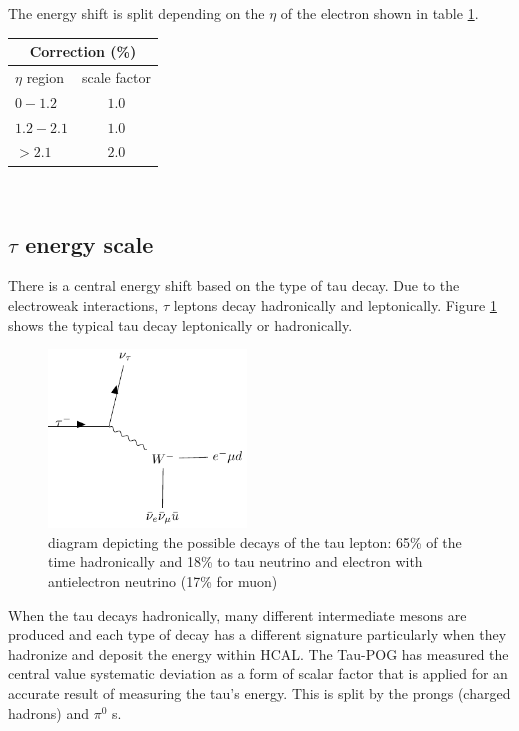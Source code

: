 The energy shift is split depending on the $\eta$ of the electron shown in table \ref{tab:EES}.\\
\begin{table}[h]
  \begin{center}
    \label{tab:EES}
    \begin{tabular} { l | c }
      \hline \multicolumn{2}{c}{Correction (\%)} \\
      \hline $\eta$ region & scale factor  \\ \hline
      $0 - 1.2$ & $1.0$ \\ 
      $1.2 - 2.1 $& $1.0 $\\ 
      $> 2.1$ & $2.0$ \\ 
    \end{tabular}
  \end{center}
\end{table}\\

\subsection{$\tau$ energy scale}
There is a central energy shift based on the type of tau decay. Due to the electroweak interactions, $\tau$ leptons decay hadronically and leptonically. Figure \ref{fig:taudecay} shows the typical tau decay leptonically or hadronically.  \\

\begin{figure}[ht!b]
\begin{center}
  \includegraphics[width=0.47\textwidth]{"Figures/taudecay.pdf"}
    \caption{\label{fig:taudecay} diagram depicting the possible decays of the tau lepton: 65\% of the time hadronically and 18\% to tau neutrino and electron with antielectron neutrino (17\% for muon)}
\end{center}
\end{figure} 
When the tau decays hadronically, many different intermediate mesons are produced and each type of decay has a different signature particularly when they hadronize and deposit the energy within HCAL. The Tau-POG has measured the central value systematic deviation as a form of scalar factor that is applied for an accurate result of measuring the tau's energy. This is split by the prongs (charged hadrons) and $\pi^0$ s.  

